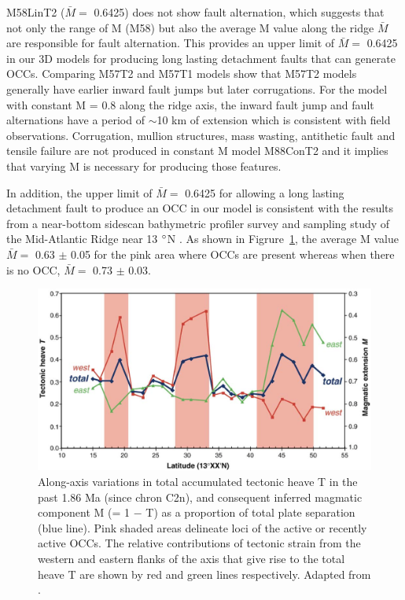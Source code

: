 M58LinT2 ($\bar{M} =$ 0.6425) does not show fault alternation, which suggests that not only the range of M (M58) but also the average M value along the ridge $\bar{M}$ are responsible for fault alternation. This provides an upper limit of $\bar{M} =$ 0.6425 in our 3D models for producing long lasting detachment faults that can generate OCCs. Comparing M57T2 and M57T1 models show that M57T2 models generally have earlier inward fault jumps but later corrugations. For the model with constant M = 0.8 along the ridge axis, the inward fault jump and fault alternations have a period of $\sim$10 km of extension which is consistent with field observations. Corrugation, mullion structures, mass wasting, antithetic fault and tensile failure are not produced in constant M model M88ConT2 and it implies that varying M is necessary for producing those features.

In addition, the upper limit of $\bar{M} = $ 0.6425 for allowing a long lasting detachment fault to produce an OCC in our model is consistent with the results from a near-bottom sidescan bathymetric profiler survey and sampling study of the Mid-Atlantic Ridge near 13 $\degree$N \citep{MacLeod2009}. As shown in Figrure~\hyperref[fig_Discussion_ResultsSummary_MacLeod2009]{\ref{fig_Discussion_ResultsSummary_MacLeod2009}}, the average M value $\bar{M} =$ 0.63 $\pm$ 0.05 for the pink area where OCCs are present whereas when there is no OCC, $\bar{M} =$ 0.73 $\pm$ 0.03.

\begin{figure}[h]
 \centering
  \includegraphics[width=1\textwidth]{./Figures/fig_Discussion_ResultsSummary_MacLeod2009.eps}
 \caption[Field observation results adapted from \citep{MacLeod2009}.]{Along-axis variations in total accumulated tectonic heave T in the past 1.86 Ma (since chron C2n), and consequent inferred magmatic component M (= 1 $-$ T) as a proportion of total plate separation (blue line). Pink shaded areas delineate loci of the active or recently active OCCs. The relative contributions of tectonic strain from the western and eastern flanks of the axis that give rise to the total heave T are shown by red and green lines respectively. Adapted from \citep{MacLeod2009}. }
 \label{fig_Discussion_ResultsSummary_MacLeod2009}
\end{figure}

